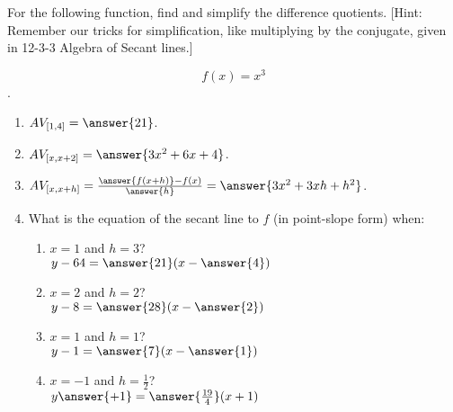 \documentclass{ximera}
\author{Elizabeth Campolongo}
\begin{document}
\begin{exercise}

For the following function, 
find and simplify the difference quotients. [Hint: Remember our tricks for simplification, like multiplying by the conjugate, given in 12-3-3 Algebra of Secant lines.]

$$f(x)= x^3$$.

\begin{enumerate}
\item $AV_{[1,4]} = \answer{21}$.


\item $AV_{[x,x+2]} =  \answer{3x^2+6x+4}$.


\item $AV_{[x,x+h]} = \frac{\answer{f(x+h)}-f(x)}{\answer{h}} = \answer{3x^2+3xh+h^2}$.  


\item What is the equation of the secant line to $f$ (in point-slope form) when: 
\begin{enumerate}
\item  $x = 1$ and $h=3$?\\
$y-64= \answer{21}(x-\answer{4})$

\item $x = 2$ and $h=2$? \\
$y-8= \answer{28}(x-\answer{2})$

\item  $x = 1$ and $h=1$?\\
$y-1= \answer{7}(x-\answer{1})$

\item $x=-1$ and $h = \frac{1}{2}$? \\
$y\answer{+1}= \answer{\frac{19}{4}}(x+1)$
\end{enumerate}

\end{enumerate}
\end{exercise}
\end{document}
